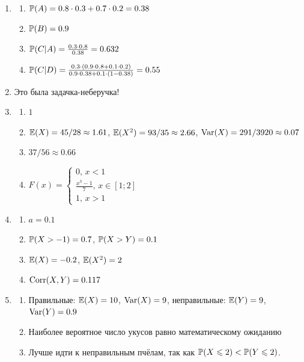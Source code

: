 \begin{enumerate}
\item
\begin{enumerate}
\item $\P(A)=0.8\cdot 0.3+0.7\cdot 0.2=0.38$
\item $\P(B)=0.9$
\item $\P(C|A)=\frac{0.3\cdot 0.8}{0.38}=0.632$
\item $\P(C|D)=\frac{0.3\cdot (0.9\cdot 0.8+0.1\cdot 0.2)}{0.9\cdot 0.38+0.1\cdot (1-0.38)}=0.55$
\end{enumerate}
\item Это была задачка-неберучка!
\item
\begin{enumerate}
\item $1$
\item $\E(X)=45/28\approx 1.61$, $\E(X^2)=93/35\approx 2.66$, $\Var(X)=291/3920\approx 0.07$
\item $37/56\approx 0.66$
\item $F(x)=\begin{cases} 0,\, x<1 \\
\frac{x^3-1}{7},\, x\in [1;2] \\
1,\, x>1 \end{cases}$
\end{enumerate}
\item
\begin{enumerate}
\item $a=0.1$
\item $\P(X>-1)=0.7$, $\P(X>Y)=0.1$
\item $\E(X)=-0.2$, $\E(X^2)=2$
\item $\Corr(X,Y)=0.117$
\end{enumerate}
\item
\begin{enumerate}
\item Правильные: $\E(X)=10$, $\Var(X)=9$, неправильные: $\E(Y)=9$, $\Var(Y)=0.9$
\item Наиболее вероятное число укусов равно математическому ожиданию
\item Лучше идти к неправильным пчёлам, так как $\P(X\leq 2)<\P(Y\leq 2)$.
\end{enumerate}
\end{enumerate}
